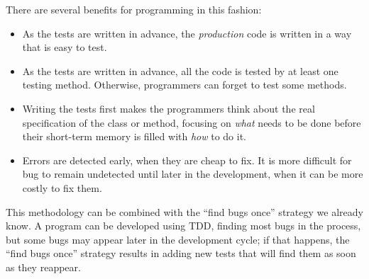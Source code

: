 There are several benefits for programming in this fashion: 

\begin{itemize}
\item As the tests are written in advance, the \emph{production} code
  is written in a way that is easy to test.
\item As the tests are written in advance, all the code is tested by
  at least one testing method. Otherwise, programmers can forget to
  test some methods.
\item Writing the tests first makes the programmers think about the
  real specification of the class or method, focusing on \emph{what}
  needs to be done before their short-term memory is filled with
  \emph{how} to do it.
\item Errors are detected early, when they are cheap to fix. It is
  more difficult for bug to remain undetected until later in the
  development, when it can be more costly to fix them.
\end{itemize}

This methodology can be combined with the ``find bugs once'' strategy
we already know. A program can be developed using TDD, finding most
bugs in the process, but some bugs may appear later in the development
cycle; if that happens, the ``find bugs once'' strategy results in
adding new tests that will find them as soon as they reappear.


